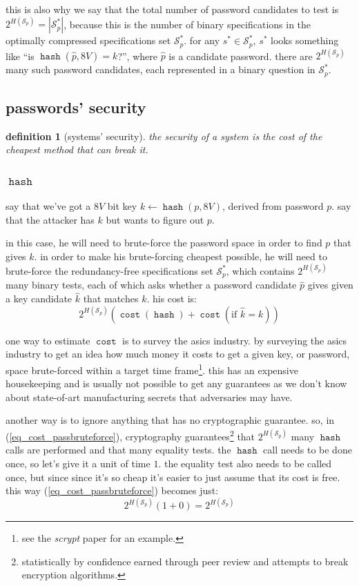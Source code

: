 \documentclass[twocolumn]{article}
\newtheorem{definition}{definition}
\DeclareMathOperator{\hash}{\mathtt{hash}}
\DeclareMathOperator{\cost}{\mathtt{cost}}
\begin{document}
this is also why we say that the total number of password candidates to
test is $2^{H(\mathcal{S}_p)} = |\mathcal{S}_p^*|$, because this is the
number of binary specifications in the optimally compressed specifications
set $\mathcal{S}_p^*$.  for any $s^* \in \mathcal{S}_p^*$, $s^*$ looks
something like ``is $\hash(\hat p, 8V) = k$?'', where $\hat p$ is a
candidate password.  there are $2^{H(\mathcal{S}_p)}$ many such password
candidates, each represented in a binary question in $\mathcal{S}_p^*$.

\subsection{passwords' security}
\begin{definition}[systems' security]
the security of a system is the cost of the cheapest method that can break
it.
\end{definition}

\subsubsection{$\hash$}
say that we've got a $8V$ bit key $k \gets \hash(p, 8V)$, derived from
password $p$.  say that the attacker has $k$ but wants to figure out $p$.

in this case, he will need to brute-force the password space in order to
find $p$ that gives $k$.  in order to make his brute-forcing cheapest
possible, he will need to brute-force the redundancy-free specifications
set $\mathcal{S}_p^*$, which contains $2^{H(\mathcal{S}_p)}$ many binary
tests, each of which asks whether a password candidate $\hat p$ gives given
a key candidate $\hat k$ that matches $k$.  his cost is:
\begin{equation}\label{eq_cost_passbruteforce}
    2^{H(\mathcal{S}_p)} \left(
        \cost(\hash) + \cost(\text{if } \hat k = k)
    \right)
\end{equation}

one way to estimate $\cost$ is to survey the asics industry.  by surveying
the asics industry to get an idea how much money it costs to get a given
key, or password, space brute-forced within a target time
frame\footnote{see the \emph{scrypt} paper for an example.}.  this has an
expensive housekeeping and is usually not possible to get any guarantees as
we don't know about state-of-art manufacturing secrets that adversaries may
have.

another way is to ignore anything that has no cryptographic guarantee.  so,
in (\ref{eq_cost_passbruteforce}), cryptography
guarantees\footnote{statistically by confidence earned through peer review
and attempts to break encryption algorithms.} that $2^{H(\mathcal{S}_p)}$
many $\hash$ calls are performed and that many equality tests.  the $\hash$
call needs to be done once, so let's give it a unit of time $1$.  the
equality test also needs to be called once, but since since it's so cheap
it's easier to just assume that its cost is free.  this way
(\ref{eq_cost_passbruteforce})
becomes just:
\begin{equation}\label{eq_simplecost_passbruteforce}
    2^{H(\mathcal{S}_p)} (1+0) = 2^{H(\mathcal{S}_p)}
\end{equation}
\end{document}
